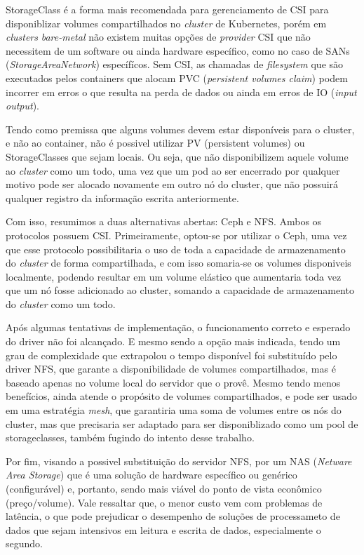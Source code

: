 StorageClass é a forma mais recomendada para gerenciamento de CSI para disponiblizar volumes compartilhados no \emph{cluster} de Kubernetes\textregistered, porém em \emph{clusters }\emph{bare-metal} não existem muitas opções de \emph{provider} CSI que não necessitem de um software ou ainda hardware específico, como no caso de SANs (\emph{StorageAreaNetwork}) específícos. Sem CSI, as chamadas de \emph{filesystem} que são executados pelos containers que alocam PVC (\emph{persistent volumes claim}) podem incorrer em erros o que resulta na perda de dados ou ainda em erros de IO (\emph{input output}). 


Tendo como premissa que alguns volumes devem estar disponíveis para o cluster, e não ao container, não é possivel utilizar PV (persistent volumes) ou StorageClasses que sejam locais. Ou seja, que não disponibilizem aquele volume ao \emph{cluster} como um todo, uma vez que um pod ao ser encerrado por qualquer motivo pode ser alocado novamente em outro nó do cluster, que não possuirá qualquer registro da informação escrita anteriormente. 

Com isso, resumimos a duas alternativas abertas: Ceph e NFS. Ambos os protocolos possuem CSI. Primeiramente, optou-se por utilizar o Ceph, uma vez que esse protocolo possibilitaria o uso de toda a capacidade de armazenamento do \emph{cluster} de forma compartilhada, e com isso somaria-se os volumes disponiveis localmente, podendo resultar em um volume elástico que aumentaria toda vez que um nó fosse adicionado ao cluster, somando a capacidade de armazenamento do \emph{cluster} como um todo. 

Após algumas tentativas de implementação, o funcionamento correto e esperado do driver não foi alcançado. E mesmo sendo a opção mais indicada, tendo um grau de complexidade que extrapolou o tempo disponível foi substituído pelo driver NFS, que garante a disponibilidade de volumes compartilhados, mas é baseado apenas no volume local do servidor que o provê. Mesmo tendo menos benefícios, ainda atende o propósito de volumes compartilhados, e pode ser usado em uma estratégia \emph{mesh}, que garantiria uma soma de volumes entre os nós do cluster, mas que precisaria ser adaptado para ser disponiblizado como um pool de storageclasses, também fugindo do intento desse trabalho.

Por fim, visando a possivel substituição do servidor NFS, por um NAS (\emph{Netware Area Storage}) que é uma solução de hardware específico ou genérico (configurável) e, portanto, sendo mais viável do ponto de vista econômico (preço/volume). Vale ressaltar que, o menor custo vem com problemas de latência, o que pode prejudicar o desempenho de soluções de processameto de dados que sejam intensivos em leitura e escrita de dados, especialmente o segundo.

